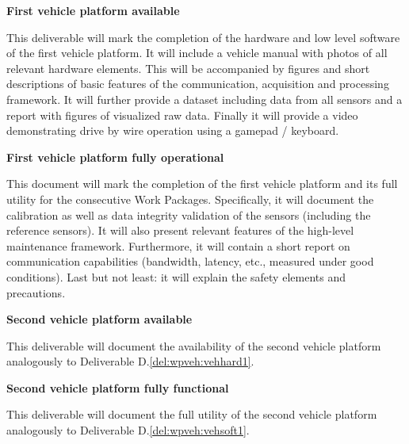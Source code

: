{\begin{tasks}{\WPVehicleNo}
\end{tasks}


\begin{deliverables}{\WPVehicleNo}

\item {\bf First vehicle platform available} 
	\delresponsible{\VW}
	\label{del:wpveh:vehhard1}

This deliverable will mark the completion of the hardware and low level software of the first vehicle platform. It will include a vehicle manual with photos of all relevant hardware elements. This will be accompanied by figures and short descriptions of basic features of the communication, acquisition and processing framework. It will further provide a dataset including data from all sensors and a report with figures of visualized raw data. Finally it will provide a video demonstrating drive by wire operation using a gamepad / keyboard. 

\item {\bf First vehicle platform fully operational} 
	\delresponsible{\VW, \ETHZ, \IBM}
	\label{del:wpveh:vehsoft1}
 
This document will mark the completion of the first vehicle platform and its full utility for the consecutive Work Packages. Specifically, it will document the calibration as well as data integrity validation of the sensors (including the reference sensors). It will also present relevant features of the high-level maintenance framework. Furthermore, it will contain a short report on communication capabilities (bandwidth, latency, etc., measured under good conditions). Last but not least: it will explain the safety elements and precautions.

\item {\bf Second vehicle platform available} 
  \delresponsible{\VW}
	
This deliverable will document the availability of the second vehicle platform analogously to Deliverable D\WPVehicleNo.\ref{del:wpveh:vehhard1}.

\item {\bf Second vehicle platform fully functional} 
  \delresponsible{\VW, \ETHZ, \IBM}
	
This deliverable will document the full utility of the second vehicle platform analogously to Deliverable D\WPVehicleNo.\ref{del:wpveh:vehsoft1}.


\end{deliverables}}
